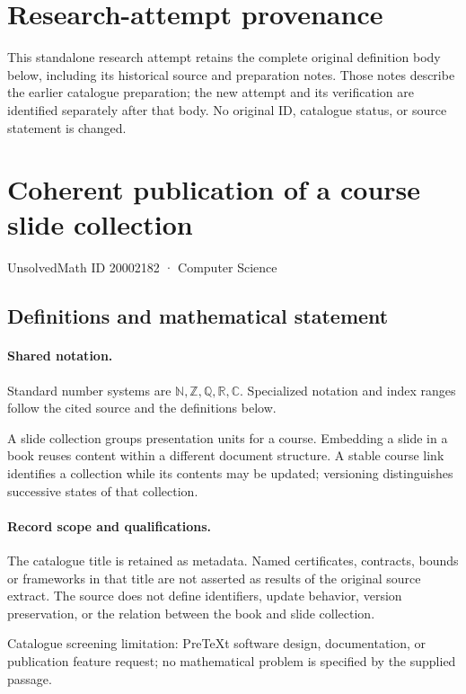 \documentclass[11pt]{article}
\begin{document}
\section*{Research-attempt provenance}
This standalone research attempt retains the complete original definition body below,
including its historical source and preparation notes. Those notes describe the
earlier catalogue preparation; the new attempt and its verification are identified
separately after that body. No original ID, catalogue status, or source statement is changed.

\section{Coherent publication of a course slide collection}\label{20002182}
{\small UnsolvedMath ID 20002182 · Computer Science}
\subsection{Definitions and mathematical statement}

\paragraph{Shared notation.}Standard number systems are $\mathbb N,\mathbb Z,\mathbb Q,\mathbb R,\mathbb C$. Specialized notation and index ranges follow the cited source and the definitions below.


A slide collection groups presentation units for a course. Embedding a slide in a book reuses content within a different document structure. A stable course link identifies a collection while its contents may be updated; versioning distinguishes successive states of that collection.
\paragraph{Record scope and qualifications.}
The catalogue title is retained as metadata. Named certificates, contracts, bounds or frameworks in that title are not asserted as results of the original source extract.
The source does not define identifiers, update behavior, version preservation, or the relation between the book and slide collection.

Catalogue screening limitation: PreTeXt software design, documentation, or publication feature request; no mathematical problem is specified by the supplied passage.
\end{document}
